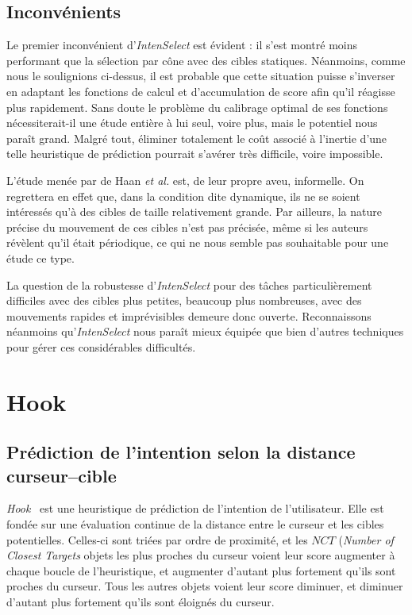 	\subsection{Inconvénients}
	Le premier inconvénient d'\emph{IntenSelect} est évident : il s'est montré moins performant que la sélection par cône avec des cibles statiques. Néanmoins, comme nous le soulignions ci-dessus, il est probable que cette situation puisse s'inverser en adaptant les fonctions de calcul et d'accumulation de score afin qu'il réagisse plus rapidement. Sans doute le problème du calibrage optimal de ses fonctions nécessiterait-il une étude entière à lui seul, voire plus, mais le potentiel nous paraît grand. Malgré tout, éliminer totalement le coût associé à l'inertie d'une telle heuristique de prédiction pourrait s'avérer très difficile, voire impossible.
	
	L'étude menée par de Haan \emph{et al.} est, de leur propre aveu, informelle. On regrettera en effet que, dans la condition dite dynamique, ils ne se soient intéressés qu'à des cibles de taille relativement grande. Par ailleurs, la nature précise du mouvement de ces cibles n'est pas précisée, même si les auteurs révèlent qu'il était périodique, ce qui ne nous semble pas souhaitable pour une étude ce type.
	
	La question de la robustesse d'\emph{IntenSelect} pour des tâches particulièrement difficiles avec des cibles plus petites, beaucoup plus nombreuses, avec des mouvements rapides et imprévisibles demeure donc ouverte. Reconnaissons néanmoins qu'\emph{IntenSelect} nous paraît mieux équipée que bien d'autres techniques pour gérer ces considérables difficultés.
		
\section{Hook}
	\subsection{Prédiction de l'intention selon la distance curseur--cible}
	\emph{Hook}~\cite{ortega2013hook} est une heuristique de prédiction de l'intention de l'utilisateur. Elle est fondée sur une évaluation continue de la distance entre le curseur et les cibles potentielles. Celles-ci sont triées par ordre de proximité, et les $NCT$ (\emph{Number of Closest Targets} objets les plus proches du curseur voient leur score augmenter à chaque boucle de l'heuristique, et augmenter d'autant plus fortement qu'ils sont proches du curseur. Tous les autres objets voient leur score diminuer, et diminuer d'autant plus fortement qu'ils sont éloignés du curseur.
		
